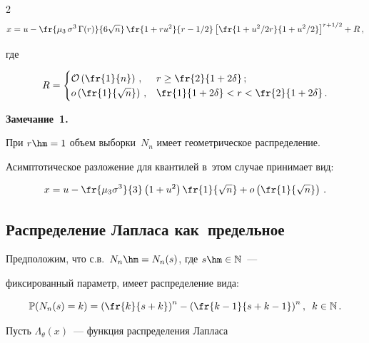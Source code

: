 \begin{multicols}{2}
$$

x = u-\fr{\mu_3\, \sigma^{3}\, \Gamma(r)}

{6\sqrt{n}}\, \fr{1+ru^{2}}{r-1/2} \left[

\fr{1+u^{2}/2r}{1+u^{2}/2}\right]^{r+1/2}+R\,,

$$

где 

$$

R =  \begin{cases}     

\mathcal{O}\left(\fr{1}{n}\right)\,, & r\ge \fr{2}{1+2\delta}\,; \\

   o\left(\fr{1}{\sqrt{n}}\right) \,, & \fr{1}{1+2\delta}<r<\fr{2}{1+2\delta}\,.

            \end{cases}

            $$



\noindent

\textbf{Замечание~1.}\

При $r\hm=1$ объем выборки~$N_n$ имеет геометрическое распределение. 

Асимптотическое разложение для квантилей в~этом случае принимает вид:

$$

x  = u-\fr{\mu_3 \sigma^{3}}{3}\left( 

1+u^{2}\right)\fr{1}{\sqrt{n}}+o\left(\fr{1}{\sqrt{n}}\right)\,.

$$





\subsection{Распределение Лапласа как~предельное}



Предположим, что с.в.\ $N_n \hm= N_n(s)$, где $s\hm\in\mathbb{N}$~--- 

фиксированный параметр, имеет распределение вида:

$$

\mathbb{P}(N_n(s)=k)=\left(\fr{k}{s+k}\right)^{n} - 

\left(\fr{k-1}{s+k-1}\right)^{n},\enskip k \in \mathbb{N}\,.

$$



Пусть  $\Lambda_{\theta}(x)$~--- функция распределения Лапласа 


\end{multicols}
